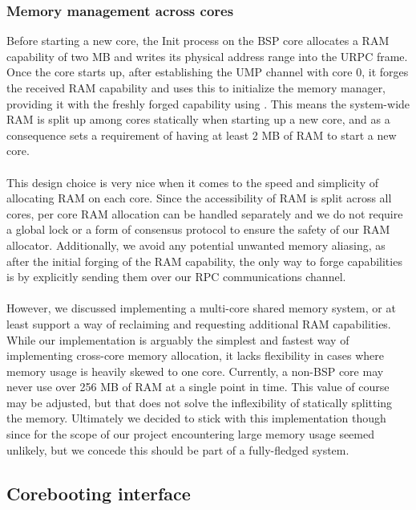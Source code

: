 \subsubsection{Memory management across cores} \label{mm_across_cores}
Before starting a new core, the Init process on the BSP core allocates a RAM capability of two MB and writes its physical address range into the URPC frame. Once the core starts up, after establishing the UMP channel with core 0, it forges the received RAM capability and uses this to initialize the memory manager, providing it with the freshly forged capability using  . This means the system-wide RAM is split up among cores statically when starting up a new core, and as a consequence sets a requirement of having at least 2 MB of RAM to start a new core.  
\paragraph{}
This design choice is very nice when it comes to the speed and simplicity of allocating RAM on each core. Since the accessibility of RAM is split across all cores, per core RAM allocation can be handled separately and we do not require a global lock or a form of consensus protocol to ensure the safety of our RAM allocator. Additionally, we avoid any potential unwanted memory aliasing, as after the initial forging of the RAM capability, the only way to forge capabilities is by explicitly sending them over our RPC communications channel. 
\paragraph{}
However, we discussed implementing a multi-core shared memory system, or at least support a way of reclaiming and requesting additional RAM capabilities. While our implementation is arguably the simplest and fastest way of implementing cross-core memory allocation, it lacks flexibility in cases where memory usage is heavily skewed to one core. Currently, a non-BSP core may never use over 256 MB of RAM at a single point in time. This value of course may be adjusted, but that does not solve the inflexibility of statically splitting the memory. Ultimately we decided to stick with this implementation though since for the scope of our project encountering large memory usage seemed unlikely, but we concede this should be part of a fully-fledged system.




\subsection{Corebooting interface}


